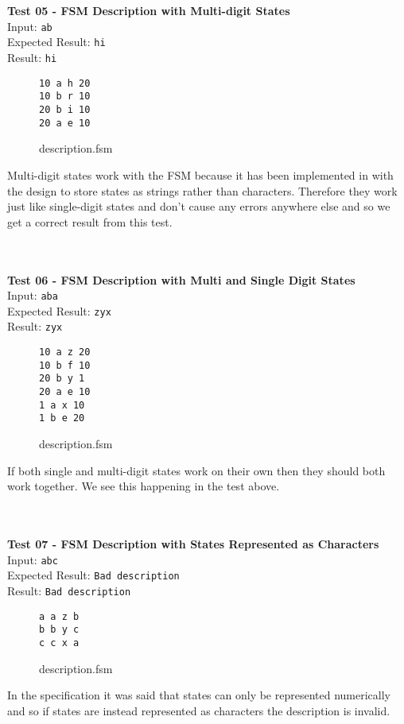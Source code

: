 \documentclass{article}
\begin{document}
\noindent \\ \\ \textbf{Test 05 - FSM Description with Multi-digit States} \\
\noindent Input: \verb+ab+ \\
Expected Result: \verb+hi+ \\
Result: \verb+hi+ \\
\begin{figure}[H]
\center
\begin{BVerbatim}
10 a h 20
10 b r 10
20 b i 10
20 a e 10
\end{BVerbatim}
\caption{description.fsm}
\end{figure}
\noindent Multi-digit states work with the FSM because it has been implemented in with the design to store states as strings rather than characters. Therefore they work just like single-digit states and don't cause any errors anywhere else and so we get a correct result from this test.

\noindent \\ \\ \textbf{Test 06 - FSM Description with Multi and Single Digit States} \\
\noindent Input: \verb+aba+ \\
Expected Result: \verb+zyx+ \\
Result: \verb+zyx+ \\
\begin{figure}[H]
\center
\begin{BVerbatim}
10 a z 20
10 b f 10
20 b y 1
20 a e 10
1 a x 10
1 b e 20
\end{BVerbatim}
\caption{description.fsm}
\end{figure}
\noindent If both single and multi-digit states work on their own then they should both work together. We see this happening in the test above.

\noindent \\ \\ \textbf{Test 07 - FSM Description with States Represented as Characters} \\
\noindent Input: \verb+abc+ \\
Expected Result: \verb+Bad description+ \\
Result: \verb+Bad description+ \\
\begin{figure}[H]
\center
\begin{BVerbatim}
a a z b
b b y c
c c x a
\end{BVerbatim}
\caption{description.fsm}
\end{figure}
\noindent In the specification it was said that states can only be represented numerically and so if states are instead represented as characters the description is invalid.
\end{document}
